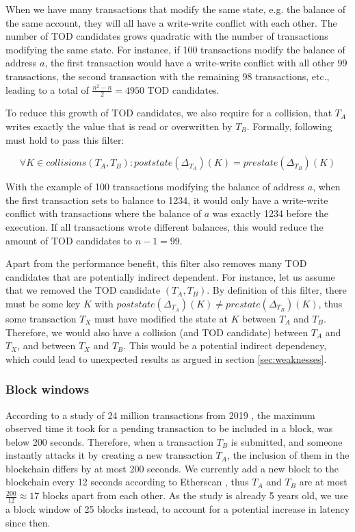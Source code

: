 \documentclass[draft,final]{vutinfth} %
\begin{document}
When we have many transactions that modify the same state, e.g. the balance of the same account, they will all have a write-write conflict with each other. The number of TOD candidates grows quadratic with the number of transactions modifying the same state. For instance, if 100 transactions modify the balance of address $a$, the first transaction would have a write-write conflict with all other 99 transactions, the second transaction with the remaining 98 transactions, etc., leading to a total of $\frac{n^2-n}{2} = 4950$ TOD candidates.

To reduce this growth of TOD candidates, we also require for a collision, that $T_A$ writes exactly the value that is read or overwritten by $T_B$. Formally, following must hold to pass this filter:

$$\forall K \in collisions(T_A, T_B)\colon poststate(\Delta_{T_A})(K) = prestate(\Delta_{T_B})(K)$$

With the example of 100 transactions modifying the balance of address $a$, when the first transaction sets to balance to 1234, it would only have a write-write conflict with transactions where the balance of $a$ was exactly 1234 before the execution. If all transactions wrote different balances, this would reduce the amount of TOD candidates to $n-1 = 99$.

Apart from the performance benefit, this filter also removes many TOD candidates that are potentially indirect dependent. For instance, let us assume that we removed the TOD candidate $(T_A, T_B)$. By definition of this filter, there must be some key $K$ with $poststate(\Delta_{T_A})(K) \neq prestate(\Delta_{T_B})(K)$, thus some transaction $T_X$ must have modified the state at $K$ between $T_A$ and $T_B$. Therefore, we would also have a collision (and TOD candidate) between $T_A$ and $T_X$, and between $T_X$ and $T_B$. This would be a potential indirect dependency, which could lead to unexpected results as argued in section \ref{sec:weaknesses}.

\subsubsection{Block windows}

According to a study of 24 million transactions from 2019 \cite{zhang_evaluation_2021}, the maximum observed time it took for a pending transaction to be included in a block, was below 200 seconds. Therefore, when a transaction $T_B$ is submitted, and someone instantly attacks it by creating a new transaction $T_A$, the inclusion of them in the blockchain differs by at most 200 seconds. We currently add a new block to the blockchain every 12 seconds according to Etherscan \cite{etherscan_ethereum_2024}, thus $T_A$ and $T_B$ are at most $\frac{200}{12} \approx 17$ blocks apart from each other. As the study is already 5 years old, we use a block window of 25 blocks instead, to account for a potential increase in latency since then.
\end{document}
